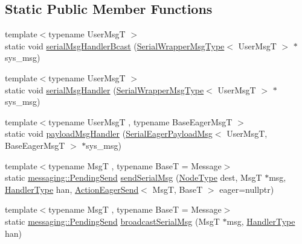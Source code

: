 \subsection*{Static Public Member Functions}
\begin{DoxyCompactItemize}
\item 
{\footnotesize template$<$typename User\+MsgT $>$ }\\static void \hyperlink{structvt_1_1serialization_1_1_serialized_messenger_adc342b3e5a4a536182f6045c5fe485b7}{serial\+Msg\+Handler\+Bcast} (\hyperlink{structvt_1_1serialization_1_1_serialized_messenger_a279027d1664b42cf7f288dc3fc9c3014}{Serial\+Wrapper\+Msg\+Type}$<$ User\+MsgT $>$ $\ast$sys\+\_\+msg)
\item 
{\footnotesize template$<$typename User\+MsgT $>$ }\\static void \hyperlink{structvt_1_1serialization_1_1_serialized_messenger_aad74b93ed6e38beb26ce31d69eb85a71}{serial\+Msg\+Handler} (\hyperlink{structvt_1_1serialization_1_1_serialized_messenger_a279027d1664b42cf7f288dc3fc9c3014}{Serial\+Wrapper\+Msg\+Type}$<$ User\+MsgT $>$ $\ast$sys\+\_\+msg)
\item 
{\footnotesize template$<$typename User\+MsgT , typename Base\+Eager\+MsgT $>$ }\\static void \hyperlink{structvt_1_1serialization_1_1_serialized_messenger_adef4a4664f9eab8eca28304871540791}{payload\+Msg\+Handler} (\hyperlink{namespacevt_1_1serialization_af3a0dfd4a0d3fa09c75edba0dc1b7fec}{Serial\+Eager\+Payload\+Msg}$<$ User\+MsgT, Base\+Eager\+MsgT $>$ $\ast$sys\+\_\+msg)
\item 
{\footnotesize template$<$typename MsgT , typename BaseT  = Message$>$ }\\static \hyperlink{structvt_1_1messaging_1_1_pending_send}{messaging\+::\+Pending\+Send} \hyperlink{structvt_1_1serialization_1_1_serialized_messenger_a2e9c1f9f5c6923f8ad3467e62542f5ab}{send\+Serial\+Msg} (\hyperlink{namespacevt_a866da9d0efc19c0a1ce79e9e492f47e2}{Node\+Type} dest, MsgT $\ast$msg, \hyperlink{namespacevt_af64846b57dfcaf104da3ef6967917573}{Handler\+Type} han, \hyperlink{namespacevt_1_1serialization_a009aa1de8d42a3c97643b947fcc6f0b6}{Action\+Eager\+Send}$<$ MsgT, BaseT $>$ eager=nullptr)
\item 
{\footnotesize template$<$typename MsgT , typename BaseT  = Message$>$ }\\static \hyperlink{structvt_1_1messaging_1_1_pending_send}{messaging\+::\+Pending\+Send} \hyperlink{structvt_1_1serialization_1_1_serialized_messenger_addd144d5384b068bc4bf37eaf17461a5}{broadcast\+Serial\+Msg} (MsgT $\ast$msg, \hyperlink{namespacevt_af64846b57dfcaf104da3ef6967917573}{Handler\+Type} han)

\end{DoxyCompactItemize}
